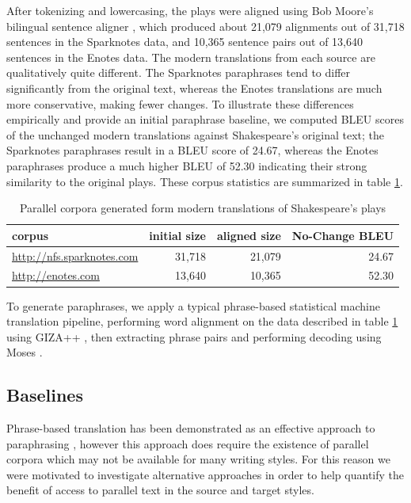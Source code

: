 \documentclass[10pt,a5paper,twoside]{article}
\begin{document}
After tokenizing and lowercasing, the plays were aligned using Bob Moore's bilingual sentence aligner \cite{Moore02}, which produced about 21,079 alignments out of 31,718 sentences in the Sparknotes data, and 10,365 sentence pairs out of 13,640 sentences in the Enotes data.  The modern translations from each source are qualitatively quite
different.  The Sparknotes paraphrases tend to differ significantly from the original text, whereas the Enotes translations are much more conservative, making fewer changes.
To illustrate these differences empirically and provide an initial paraphrase baseline, we computed BLEU scores of the unchanged modern translations against Shakespeare's 
original text; the Sparknotes paraphrases result in a BLEU score of 24.67, whereas the Enotes paraphrases produce a much higher BLEU of 52.30 indicating their strong similarity to the original plays.
These corpus statistics are summarized in table \ref{corpus_stats}.

\begin{table}
  \begin{center}
    \begin{tabular}{|l|r|r|r|}
      \hline
      corpus & initial size & aligned size & No-Change BLEU\\
      \hline
      \hline
      \url{http://nfs.sparknotes.com} & 31,718 & 21,079 & 24.67 \\
      \hline
      \url{http://enotes.com} & 13,640 & 10,365 & 52.30 \\
      \hline
    \end{tabular}
  \end{center}
  \caption{Parallel corpora generated form modern translations of Shakespeare's plays}
  \label{corpus_stats}
\end{table}

To generate paraphrases, we apply a typical phrase-based statistical machine translation pipeline, performing
word alignment on the data described in table \ref{corpus_stats} using GIZA++ \cite{Och03}, then extracting phrase pairs and performing decoding using Moses \cite{Koehn07}.

\subsection{Baselines}
Phrase-based translation has been demonstrated as an effective approach to paraphrasing \cite{quirk04,chen11}, however this approach does require the existence of
parallel corpora which may not be available for many writing styles.  For this reason we were motivated to investigate alternative approaches in order to help
quantify the benefit of access to parallel text in the source and target styles.
\end{document}
